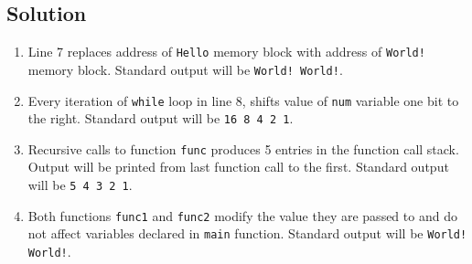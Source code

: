 
\subsection*{Solution}

\begin{enumerate}[label=(\alph*)]
\item
Line 7 replaces address of \texttt{Hello} memory block with address of \texttt{World!} memory block.
Standard output will be \texttt{World! World!}.

\item
Every iteration of \texttt{while} loop in line 8, shifts value of \texttt{num} variable one bit to the right.
Standard output will be \texttt{16 8 4 2 1}.

\item
Recursive calls to function \texttt{func} produces 5 entries in the function call stack.
Output will be printed from last function call to the first.
Standard output will be \texttt{5 4 3 2 1}.

\item
Both functions \texttt{func1} and \texttt{func2} modify the value they are passed to and do not affect variables declared in \texttt{main} function.
Standard output will be \texttt{World! World!}.
\end{enumerate}
